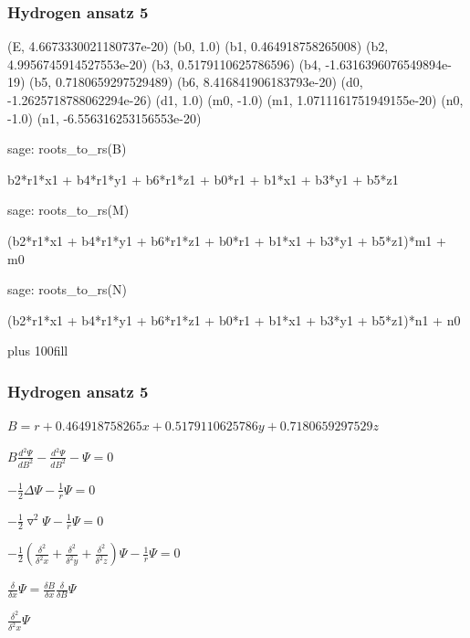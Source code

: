 \documentclass{beamer}
\begin{document}
\begin{frame}[fragile]
\frametitle{Hydrogen ansatz 5}
\begin{semiverbatim}
\tiny

(E, 4.6673330021180737e-20)
(b0, 1.0)
(b1, 0.464918758265008)
(b2, 4.9956745914527553e-20)
(b3, 0.5179110625786596)
(b4, -1.6316396076549894e-19)
(b5, 0.7180659297529489)
(b6, 8.416841906183793e-20)
(d0, -1.2625718788062294e-26)
(d1, 1.0)
(m0, -1.0)
(m1, 1.0711161751949155e-20)
(n0, -1.0)
(n1, -6.556316253156553e-20)

sage: roots_to_rs(B)

b2*r1*x1 + b4*r1*y1 + b6*r1*z1 + b0*r1 + b1*x1 + b3*y1 + b5*z1

sage: roots_to_rs(M)

(b2*r1*x1 + b4*r1*y1 + b6*r1*z1 + b0*r1 + b1*x1 + b3*y1 + b5*z1)*m1 + m0

sage: roots_to_rs(N)

(b2*r1*x1 + b4*r1*y1 + b6*r1*z1 + b0*r1 + b1*x1 + b3*y1 + b5*z1)*n1 + n0

\end{semiverbatim}
\vskip 0pt plus 100fill
\end{frame}

\begin{frame}[fragile]
\frametitle{Hydrogen ansatz 5}

\centerline{$B = r + 0.464918758265 x + 0.5179110625786 y + 0.7180659297529 z$}
\vskip 20pt
\centerline{$B \frac{d^2\Psi}{dB^2} - \frac{d^2\Psi}{dB^2} - \Psi = 0$}
\vskip 20pt

\centerline{$-\frac{1}{2} \Delta \Psi - \frac{1}{r}\Psi = 0$}
\vskip 20pt
\centerline{$-\frac{1}{2} \triangledown^2 \Psi - \frac{1}{r}\Psi = 0$}
\vskip 20pt

\centerline{$-\frac{1}{2} \left(\frac{\delta^2}{\delta^2 x} + \frac{\delta^2}{\delta^2 y} + \frac{\delta^2}{\delta^2 z}\right) \Psi - \frac{1}{r}\Psi = 0$}

\centerline{$\frac{\delta}{\delta x} \Psi = \frac{\delta B}{\delta x} \frac{\delta}{\delta B}  \Psi$}

\centerline{$\frac{\delta^2}{\delta^2 x} \Psi$}


\end{frame}
\end{document}
